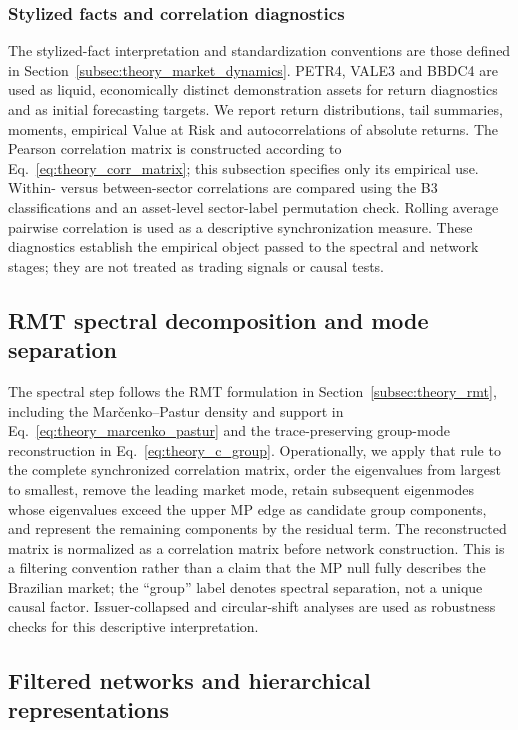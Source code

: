 \subsubsection{Stylized facts and correlation diagnostics}
\label{subsec:stylized_method}

The stylized-fact interpretation and standardization conventions are those defined in Section~\ref{subsec:theory_market_dynamics}. PETR4, VALE3 and BBDC4 are used as liquid, economically distinct demonstration assets for return diagnostics and as initial forecasting targets. We report return distributions, tail summaries, moments, empirical Value at Risk and autocorrelations of absolute returns. The Pearson correlation matrix is constructed according to Eq.~\eqref{eq:theory_corr_matrix}; this subsection specifies only its empirical use. Within- versus between-sector correlations are compared using the B3 classifications and an asset-level sector-label permutation check. Rolling average pairwise correlation is used as a descriptive synchronization measure. These diagnostics establish the empirical object passed to the spectral and network stages; they are not treated as trading signals or causal tests.

\subsection{RMT spectral decomposition and mode separation}
\label{subsec:rmt_method}

The spectral step follows the RMT formulation in Section~\ref{subsec:theory_rmt}, including the Mar\v{c}enko--Pastur density and support in Eq.~\eqref{eq:theory_marcenko_pastur} and the trace-preserving group-mode reconstruction in Eq.~\eqref{eq:theory_c_group}. Operationally, we apply that rule to the complete synchronized correlation matrix, order the eigenvalues from largest to smallest, remove the leading market mode, retain subsequent eigenmodes whose eigenvalues exceed the upper MP edge as candidate group components, and represent the remaining components by the residual term. The reconstructed matrix is normalized as a correlation matrix before network construction. This is a filtering convention rather than a claim that the MP null fully describes the Brazilian market; the ``group'' label denotes spectral separation, not a unique causal factor. Issuer-collapsed and circular-shift analyses are used as robustness checks for this descriptive interpretation.

\subsection{Filtered networks and hierarchical representations}
\label{subsec:network_method}

